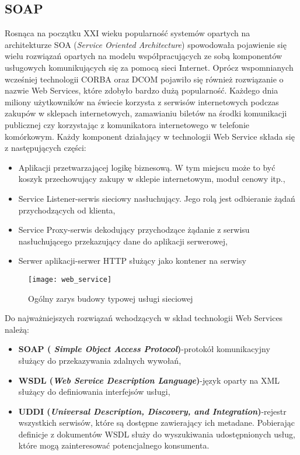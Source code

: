 \subsection{SOAP}
Rosnąca na początku XXI wieku popularność systemów opartych na architekturze SOA (\textit{Service Oriented Architecture}) spowodowała pojawienie się wielu rozwiązań opartych na modelu współpracujących ze sobą komponentów usługowych komunikujących się za pomocą sieci Internet. Oprócz wspomnianych wcześniej technologii CORBA oraz DCOM pojawiło się również rozwiązanie o nazwie Web Services, które zdobyło bardzo dużą popularność. Każdego dnia miliony użytkowników na świecie korzysta z serwisów internetowych podczas zakupów w sklepach internetowych, zamawianiu biletów na środki komunikacji publicznej czy korzystając z komunikatora internetowego w telefonie komórkowym. Każdy komponent działający w technologii Web Service składa się z następujących części\cite{snell2002programming}:
\begin{itemize}
  \item Aplikacji przetwarzającej logikę biznesową. W tym miejscu może to być koszyk przechowujący zakupy w sklepie internetowym, moduł cenowy itp.,
  \item Service Listener-serwis sieciowy nasłuchujący. Jego rolą jest odbieranie żądań przychodzących od klienta,
  \item  Service Proxy-serwis dekodujący przychodzące żądanie z serwisu nasłuchującego przekazujący dane do aplikacji serwerowej,
  \item Serwer aplikacji-serwer HTTP służący jako kontener na serwisy
\end{itemize}
\begin{figure}[h]
  \caption{Ogólny zarys budowy typowej usługi sieciowej}
  \texttt{[image: web\_service]}
  \centering
\end{figure}
\noindent
Do najważniejszych rozwiązań wchodzących w skład technologii Web Services należą:
\begin{itemize}
  \item \textbf{SOAP (\textit{ Simple Object Access Protocol})}-protokół komunikacyjny służący do przekazywania zdalnych wywołań,
  \item \textbf{WSDL (\textit{Web Service Description Language})}-język oparty na XML służący do definiowania interfejsów usługi,
  \item \textbf{UDDI (\textit{Universal Description, Discovery, and Integration})}-rejestr wszystkich serwisów, które są dostępne zawierający ich metadane. Pobierając definicje z dokumentów WSDL służy do wyszukiwania udostępnionych usług, które mogą zainteresować potencjalnego konsumenta.
\end{itemize}
